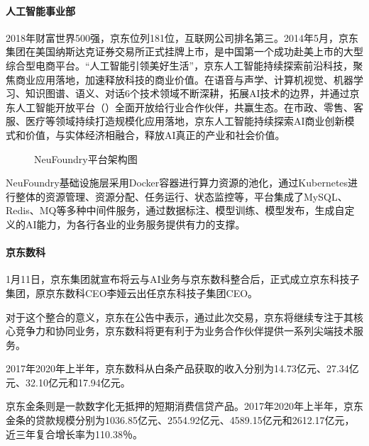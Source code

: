 \documentclass[letterpaper,10pt,english]{sphinxmanual}
\begin{document}


\paragraph{人工智能事业部}
\label{\detokenize{chapter_AI_company/jd:id7}}
2018年财富世界500强，京东位列181位，互联网公司排名第三。2014年5月，京东集团在美国纳斯达克证券交易所正式挂牌上市，是中国第一个成功赴美上市的大型综合型电商平台。“人工智能引领美好生活”，京东人工智能持续探索前沿科技，聚焦商业应用落地，加速释放科技的商业价值。在语音与声学、计算机视觉、机器学习、知识图谱、语义、对话6个技术领域不断深耕，拓展AI技术的边界，并通过京东人工智能开放平台（）全面开放给行业合作伙伴，共赢生态。在市政、零售、客服、医疗等领域持续打造规模化应用落地，京东人工智能持续探索AI商业创新模式和价值，与实体经济相融合，释放AI真正的产业和社会价值。

\begin{figure}[H]
\centering
\capstart

\noindent{}
\caption{NeuFoundry平台架构图}\label{\detokenize{chapter_AI_company/jd:id11}}\end{figure}

NeuFoundry基础设施层采用Docker容器进行算力资源的池化，通过Kubernetes进行整体的资源管理、资源分配、任务运行、状态监控等，平台集成了MySQL、Redis、MQ等多种中间件服务，通过数据标注、模型训练、模型发布，生成自定义的AI能力，为各行各业的业务服务提供有力的支撑。%
\begin{footnote}[1023]\sphinxAtStartFootnote
{}
%
\end{footnote}


\paragraph{京东数科}
\label{\detokenize{chapter_AI_company/jd:id8}}
1月11日，京东集团就宣布将云与AI业务与京东数科整合后，正式成立京东科技子集团，原京东数科CEO李娅云出任京东科技子集团CEO。

对于这个整合的意义，京东在公告中表示，通过此次交易，京东将继续专注于其核心竞争力和协同业务，京东数科将更有利于为业务合作伙伴提供一系列尖端技术服务。

2017年\sphinxhyphen{}2020年上半年，京东数科从白条产品获取的收入分别为14.73亿元、27.34亿元、32.10亿元和17.94亿元。

京东金条则是一款数字化无抵押的短期消费信贷产品。2017年\sphinxhyphen{}2020年上半年，京东金条的贷款规模分别为1036.85亿元、2554.92亿元、4589.15亿元和2612.17亿元，近三年复合增长率为110.38％。
\end{document}
